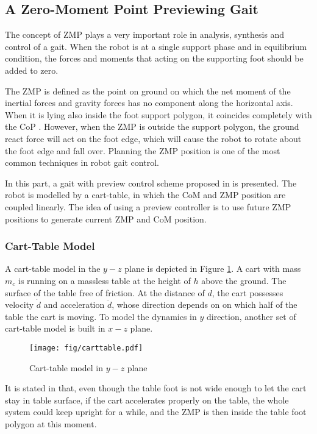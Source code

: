 \subsection{A Zero-Moment Point Previewing Gait}
\label{zmppreviewgait}
The concept of \ac{ZMP} plays a very important role in analysis, synthesis and control of a gait. When the robot is at a single support phase and in equilibrium condition, the forces and moments that acting on the supporting foot should be added to zero. 

The ZMP is defined as the point on ground on which the net moment of the inertial forces and gravity forces has no component along the horizontal axis. When it is lying also inside the foot support polygon, it coincides completely with the \ac{CoP} \cite{vukobratovic2004zero}. However, when the ZMP is outside the support polygon, the ground react force will act on the foot edge, which will cause the robot to rotate about the foot edge and fall over. Planning the ZMP position is one of the most common techniques in robot gait control.

In this part, a gait with preview control scheme proposed in \cite{kajita2003biped} is presented. The robot is modelled by a cart-table, in which the CoM and ZMP position are coupled linearly. The idea of using a preview controller is to use future ZMP positions to generate current ZMP and CoM position. 

\subsubsection{Cart-Table Model}
A cart-table model in the $ y-z $ plane is depicted in Figure {\ref{carttablemodel}}. A cart with mass $ m_c $ is running on a massless table at the height of $ h $ above the ground. The surface of the table free of friction. At the distance of $ d $, the cart possesses velocity $ \dot{d} $ and acceleration $ \ddot{d} $, whose direction depends on on which half of the table the cart is moving. To model the dynamics in $ y $ direction, another set of cart-table model is built in $ x-z $ plane.

\begin{figure}[H]
	\centering
	\texttt{[image: fig/carttable.pdf]}
	\caption{Cart-table model in $ y-z $ plane}
	\label{carttablemodel}
\end{figure}

It is stated in \cite{kajita2003biped} that, even though the table foot is not wide enough to let the cart stay in table surface, if the cart accelerates properly on the table, the whole system could keep upright for a while, and the ZMP is then inside the table foot polygon at this moment.

